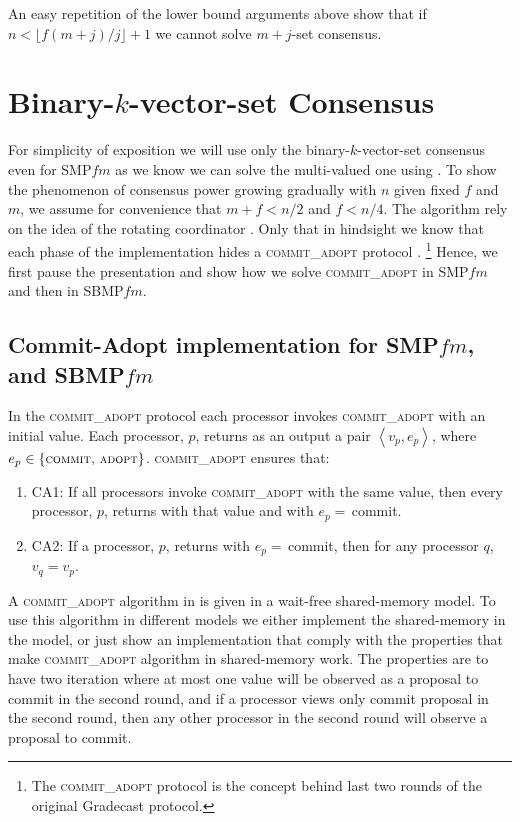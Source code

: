 \documentclass[11pt]{article}
\newcommand{\SMPfm}{\mbox{SMP\!$f\!m$}\xspace}
\newcommand{\SBMPfm}{\mbox{SBMP\!$f\!m$}\xspace}
\newcommand{\tri}[1]{\left<#1 \right>}
\def\beginsmall#1{\vspace{-\parskip}\begin{#1}\itemsep-\parskip}
\def\endsmall#1{\end{#1}\vspace{-\parskip}}
\newcommand{\ca}{{\small\textsc{commit\!\_adopt}}\xspace}
\begin{document}
An easy repetition of the lower bound arguments above show that if $n< \lfloor f(m+j)/j \rfloor+1$ we cannot solve $m+j$-set consensus.


 


\section{Binary-$k$-vector-set Consensus}
For simplicity of exposition we will use only the binary-$k$-vector-set consensus even for \SMPfm as we know we can solve
the multi-valued one using \cite{Rachid}.
To show the phenomenon of consensus power growing gradually with $n$ given fixed $f$ and $m$,
we assume for convenience  that $m+f<n/2$ and $f<n/4$.
The algorithm rely on the idea of the rotating coordinator \cite{Reischuk198523,Chandra:1991:TME:112007.112027}.
Only that in hindsight we know that each phase of the implementation hides a \ca protocol \cite{Gafni98}.
\footnote{The \ca protocol is the concept behind last two rounds  of the original
Gradecast \cite{62225} protocol. }
Hence, we first pause the presentation and show how we solve \ca in \SMPfm and then in \SBMPfm.

\subsection{Commit-Adopt implementation for \SMPfm, and \SBMPfm }

In the \ca protocol each processor invokes \ca with an initial value. Each processor, $p$,  returns as an output a pair $\tri{v_p,e_p}$, where $e_p\in\{\mbox{\small\sc commit, adopt}\}$. \ca ensures that:
\beginsmall{enumerate}
\item[\textup{ CA1:}]
If all processors invoke \ca with the same value, then every processor, $p$, returns with that value and with  $e_p =\, ${\sc commit}.
\item[\textup{ CA2:}]
If a processor, $p$, returns  with $e_p =\, ${\sc commit}, then for any processor $q$, $v_q=v_p$. 
\endsmall{enumerate}

A \ca algorithm in \cite{Gafni98} is given in a wait-free shared-memory model.
To use this algorithm in different models we either implement the shared-memory in the model, or just show an implementation that 
comply with the properties that make \ca algorithm in shared-memory work.
The properties are to have two iteration where at most one value will be observed as a proposal to commit
in the second round, and if a processor views only commit proposal in the second round, then any
other processor in the second round will observe a proposal to commit.
\end{document}

